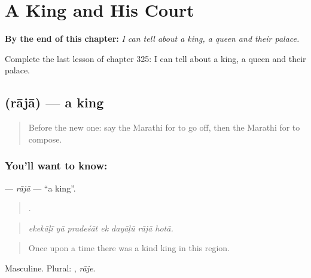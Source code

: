 
\chapter{A King and His Court}
\label{ch:mr-a-king-and-his-court}

\begin{chapteropening}
\textbf{By the end of this chapter:} \emph{I can tell about a king, a queen and their palace.}

Complete the last lesson of chapter 325: I can tell about a king, a queen and their palace.
\end{chapteropening}

\section[\texorpdfstring{\mr{राजा} (rājā)}{राजा (rājā)}]{ (rājā) — a king}

\label{lesson:MR-C325-raja}



\begin{quote}
Before the new one: say the Marathi for to go off, then the Marathi for to compose.
\end{quote}

\subsection*{You'll want to know: }
\textbf{} — \emph{rājā} — \textquotedblleft{}a king\textquotedblright{}.

\begin{quote}
      .
\end{quote}

\begin{quote}
\emph{ekekāḷī yā pradeśāt ek dayāḷū rājā hotā.}
\end{quote}

\begin{quote}
Once upon a time there was a kind king in this region.
\end{quote}

Masculine. Plural: , \emph{rāje}.

